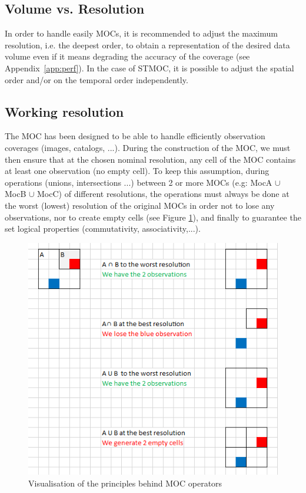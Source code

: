 \documentclass[11pt,a4paper]{ivoa}
\begin{document}
\subsection{Volume vs. Resolution}
In order to handle easily MOCs, it is recommended to adjust
the maximum resolution, i.e. the deepest order, to obtain a representation of
the desired data volume even if it means degrading the accuracy of the coverage
(see Appendix~\ref{app:perf}). In the case of STMOC, it is possible to adjust
the spatial order and/or on the temporal order independently.

\subsection{Working resolution}
The MOC has been designed to be able to handle efficiently observation
coverages (images, catalogs, ...). During the construction of the
MOC, we must then ensure that at the chosen nominal resolution, any cell
of the MOC contains at least one observation (no empty cell). To keep
this assumption, during operations (unions, intersections ...)
between 2 or more MOCs (e.g: MocA $\cup$ MocB $\cup$ MocC) of different
resolutions, the operations
must always be done at the worst (lowest) resolution of the original MOCs
in order not to lose any observations, nor to create empty cells (see
Figure \ref{fig:operation}), and finally to guarantee the set logical
properties (commutativity, associativity,...).

\begin{figure}[!htbp]
\begin{center}
\includegraphics[scale=.5]{operation.png}
\end{center}
\caption[Visualisation of MOC operations]{Visualisation of the
  principles behind MOC operators}
\label{fig:operation}
\end{figure}
\end{document}
